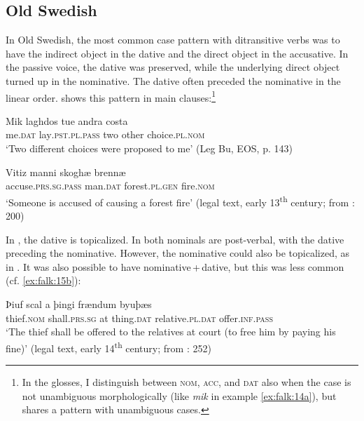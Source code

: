 \documentclass[output=paper]{langscibook}
\begin{document}
\subsection{Old Swedish}\label{sec:falk:3.3}


In Old Swedish, the most common case pattern with ditransitive verbs was to have the indirect object in the dative and the direct object in the accusative. In the passive voice, the dative was preserved, while the underlying direct object turned up in the nominative. The dative often preceded the nominative in the linear order.  shows this pattern in main clauses:\footnote{In the glosses, I distinguish between \textsc{nom,} \textsc{acc,} and \textsc{dat} also when the case is not unambiguous morphologically (like \textit{mik} in example \ref{ex:falk:14a}), but shares a pattern with unambiguous cases.}

\ea%
    \label{ex:falk:14}
\ea \label{ex:falk:14a}
\gll Mik    laghdos        tue  andra  costa\\
      me\textsc{.dat}  lay\textsc{.pst.pl.pass}  two  other    choice\textsc{.pl.nom}\\
\glt ‘Two different choices were proposed to me’ (Leg Bu, EOS, p. 143)

\ex \label{ex:falk:14b}
\gll Vitiz              manni    skoghæ      brennæ\\
      accuse\textsc{.prs.sg.pass}  man\textsc{.dat}  forest.\textsc{pl.gen}  fire.\textsc{nom}\\
\glt ‘Someone is accused of causing a forest fire’ (legal text, early 13\textsuperscript{th} century; from \citealt{Holm1952}: 200)
\z
\z

In , the dative is topicalized. In  both nominals are post-verbal, with the dative preceding the nominative. However, the nominative could also be topicalized, as in . It was also possible to have nominative\,+\,dative, but this was less common (cf. \ref{ex:falk:15b}):

\ea%
    \label{ex:falk:15}
\ea \label{ex:falk:15a}
\gll Þiuf      scal          a  þingi    frændum        byuþæs\\
      thief.\textsc{nom}  shall.\textsc{prs.sg}  at  thing.\textsc{dat}  relative.\textsc{pl}.\textsc{dat}  offer.\textsc{inf.pass}\\
\glt ‘The thief shall be offered to the relatives at court (to free him by paying his fine)’ (legal text, early 14\textsuperscript{th} century; from \citealt{Holm1952}\textsc{:} \textsc{252)}
\end{document}
